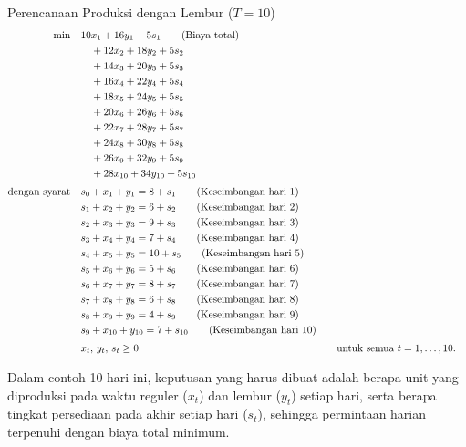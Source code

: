 \begin{examplewithallcode}{Perencanaan Produksi dengan Lembur (\(T = 10\))}
\begin{align*}
\min \quad & 10x_1 + 16y_1 + 5s_1   \tag{Biaya total} \\
             & \quad + 12x_2 + 18y_2 + 5s_2 \\
             & \quad + 14x_3 + 20y_3 + 5s_3 \\
             & \quad + 16x_4 + 22y_4 + 5s_4 \\
             & \quad + 18x_5 + 24y_5 + 5s_5 \\
             & \quad + 20x_6 + 26y_6 + 5s_6 \\
             & \quad + 22x_7 + 28y_7 + 5s_7 \\
             & \quad + 24x_8 + 30y_8 + 5s_8 \\
             & \quad + 26x_9 + 32y_9 + 5s_9 \\
             & \quad + 28x_{10} + 34y_{10} + 5s_{10} \\[1mm]
\mbox{dengan syarat}\quad        & s_0 + x_1 + y_1 = 8 + s_1   \tag{Keseimbangan hari 1} \\
             & s_1 + x_2 + y_2 = 6 + s_2   \tag{Keseimbangan hari 2} \\
             & s_2 + x_3 + y_3 = 9 + s_3   \tag{Keseimbangan hari 3} \\
             & s_3 + x_4 + y_4 = 7 + s_4   \tag{Keseimbangan hari 4} \\
             & s_4 + x_5 + y_5 = 10 + s_5   \tag{Keseimbangan hari 5} \\
             & s_5 + x_6 + y_6 = 5 + s_6   \tag{Keseimbangan hari 6} \\
             & s_6 + x_7 + y_7 = 8 + s_7   \tag{Keseimbangan hari 7} \\
             & s_7 + x_8 + y_8 = 6 + s_8   \tag{Keseimbangan hari 8} \\
             & s_8 + x_9 + y_9 = 4 + s_9   \tag{Keseimbangan hari 9} \\
             & s_9 + x_{10} + y_{10} = 7 + s_{10}   \tag{Keseimbangan hari 10} \\[1mm]
             & x_t,\, y_t,\, s_t \ge 0 &&\quad \mbox{untuk semua } t = 1,\dots,10.
\end{align*}

Dalam contoh 10 hari ini, keputusan yang harus dibuat adalah berapa unit yang diproduksi pada waktu reguler (\(x_t\)) dan lembur (\(y_t\)) setiap hari, serta berapa tingkat persediaan pada akhir setiap hari (\(s_t\)), sehingga permintaan harian terpenuhi dengan biaya total minimum.

\end{examplewithallcode}

